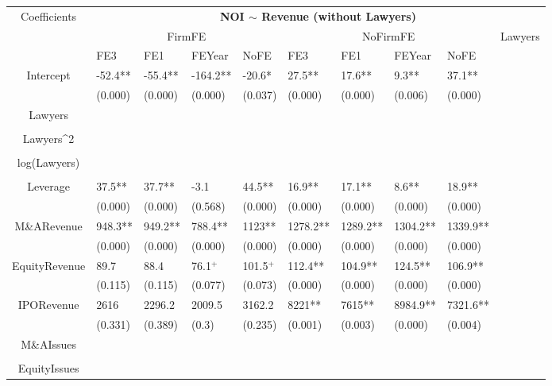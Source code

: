 \documentclass{article}
\begin{document}
\begin{table}[H]
\centering
\begin{tabular}{|clllllllll|}
\hline
\multirow{3}{*}{Coefficients} & \multicolumn{9}{c|}{\textbf{NOI $\sim$ Revenue (without Lawyers)}} \\
\cline{2-10}
& \multicolumn{4}{c}{FirmFE} & \multicolumn{4}{c}{NoFirmFE} & \multirow{2}{*}{Lawyers} \\
\cline{2-9}
& FE3 & FE1 & FEYear & NoFE & FE3 & FE1 & FEYear & NoFE &  \\
\hline
 
Intercept & -52.4** & -55.4** & -164.2** & -20.6* & 27.5** & 17.6** & 9.3** & 37.1** & \\ 
   & (0.000) & (0.000) & (0.000) & (0.037) & (0.000) & (0.000) & (0.006) & (0.000) & \\ 
  Lawyers &  &  &  &  &  &  &  &  & \\ 
   &  &  &  &  &  &  &  &  & \\ 
  Lawyers^2 &  &  &  &  &  &  &  &  & \\ 
   &  &  &  &  &  &  &  &  & \\ 
  log(Lawyers) &  &  &  &  &  &  &  &  & \\ 
   &  &  &  &  &  &  &  &  & \\ 
  Leverage & 37.5** & 37.7** & -3.1 & 44.5** & 16.9** & 17.1** & 8.6** & 18.9** & \\ 
   & (0.000) & (0.000) & (0.568) & (0.000) & (0.000) & (0.000) & (0.000) & (0.000) & \\ 
  M\&ARevenue & 948.3** & 949.2** & 788.4** & 1123** & 1278.2** & 1289.2** & 1304.2** & 1339.9** & \\ 
   & (0.000) & (0.000) & (0.000) & (0.000) & (0.000) & (0.000) & (0.000) & (0.000) & \\ 
  EquityRevenue & 89.7 & 88.4 & 76.1$^{+}$ & 101.5$^{+}$ & 112.4** & 104.9** & 124.5** & 106.9** & \\ 
   & (0.115) & (0.115) & (0.077) & (0.073) & (0.000) & (0.000) & (0.000) & (0.000) & \\ 
  IPORevenue & 2616 & 2296.2 & 2009.5 & 3162.2 & 8221** & 7615** & 8984.9** & 7321.6** & \\ 
   & (0.331) & (0.389) & (0.3) & (0.235) & (0.001) & (0.003) & (0.000) & (0.004) & \\ 
  M\&AIssues &  &  &  &  &  &  &  &  & \\ 
   &  &  &  &  &  &  &  &  & \\ 
  EquityIssues &  &  &  &  &  &  &  &  & \\ 

\end{tabular}
\end{table}
\end{document}

